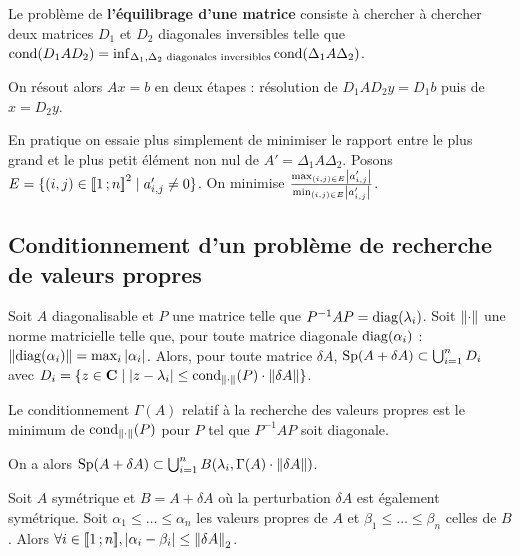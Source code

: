 	\begin{defn}
		Le problème de \textbf{l'équilibrage d'une matrice} consiste à chercher à chercher deux matrices $D_1$ et $D_2$ diagonales inversibles telle que $\operatorname{cond}(D_1 A D_2) = \inf_{\Delta_1, \Delta_2 \text{ diagonales inversibles}} \operatorname{cond}(\Delta_1 A \Delta_2)$.
	\end{defn}

	On résout alors $Ax = b$ en deux étapes : résolution de $D_1 A D_2 y = D_1 b$ puis de $x = D_2 y$.

	En pratique on essaie plus simplement de minimiser le rapport entre le plus grand et le plus petit élément non nul de $A' = \Delta_1 A \Delta_2$.
	Posons $E = \{ (i,j) \in \mathopen{[\![}1\mathclose{}\mathpunct{};n\mathclose{]\!]}^2 \mid a'_{i,j} \neq 0 \}$.
	On minimise $\frac{ \max_{(i,j) \in E} \left\lvert a'_{i,j}\right\rvert }{ \min_{(i,j) \in E} \left\lvert a'_{i,j}\right\rvert }$.

\subsection{Conditionnement d'un problème de recherche de valeurs propres}

	\begin{thm}
		Soit $A$ diagonalisable et $P$ une matrice telle que $P^{-1} A P = \operatorname{diag}(\lambda_i)$.
		Soit $\left\lVert\cdot\right\rVert$ une norme matricielle telle que, pour toute matrice diagonale $\operatorname{diag}(\alpha_i)$ : $\left\lVert\operatorname{diag}(\alpha_i)\right\rVert = \max_i \left\lvert\alpha_i\right\rvert$.
		Alors, pour toute matrice $\delta A$, $\operatorname{Sp}(A + \delta A) \subset \bigcup_{i = 1}^n D_i$ avec $D_i = \{ z \in \mathbf{C} \mid \left\lvert z - \lambda_i\right\rvert \leq \operatorname{cond}_{\left\lVert\cdot\right\rVert}(P) \cdot \left\lVert\delta A\right\rVert \}$.
	\end{thm}
	
	\begin{defn}
		Le conditionnement $\Gamma(A)$ relatif à la recherche des valeurs propres est le minimum de $\operatorname{cond}_{\left\lVert\cdot\right\rVert}(P)$ pour $P$ tel que $P^{-1} A P$ soit diagonale.
	\end{defn}

	On a alors $\operatorname{Sp}(A + \delta A) \subset \bigcup_{i = 1}^n B(\lambda_i, \Gamma(A) \cdot \left\lVert\delta A\right\rVert)$.
	
	\begin{thm}
		Soit $A$ symétrique et $B = A + \delta A$ où la perturbation $\delta A$ est également symétrique.
		Soit $\alpha_1 \leq \ldots \leq \alpha_n$ les valeurs propres de $A$ et $\beta_1 \leq \ldots \leq \beta_n$ celles de $B$.
		Alors $\forall i \in \mathopen{[\![}1\mathclose{}\mathpunct{};n\mathclose{]\!]}, \left\lvert\alpha_i - \beta_i\right\rvert \leq \left\lVert\delta A\right\rVert_2$.
	\end{thm}
